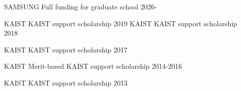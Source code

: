 





\begin{cvhonors}

  \cvhonor
    {SAMSUNG} %
    {Full funding for graduate school} %
    {} %
    {2026- } %
    

  \cvhonor
    {KAIST} %
    {KAIST support scholarship} %
    {} %
    {2019} %
  \cvhonor
    {KAIST} %
    {KAIST support scholarship} %
    {} %
    {2018} %

  \cvhonor
    {KAIST} %
    {KAIST support scholarship} %
    {} %
    {2017} %

  \cvhonor
    {KAIST} %
    {Merit-based KAIST support scholarship } %
    {} %
    {2014-2016} %

  \cvhonor
    {KAIST} %
    {KAIST support scholarship} %
    {} %
    {2013} %

\end{cvhonors}



